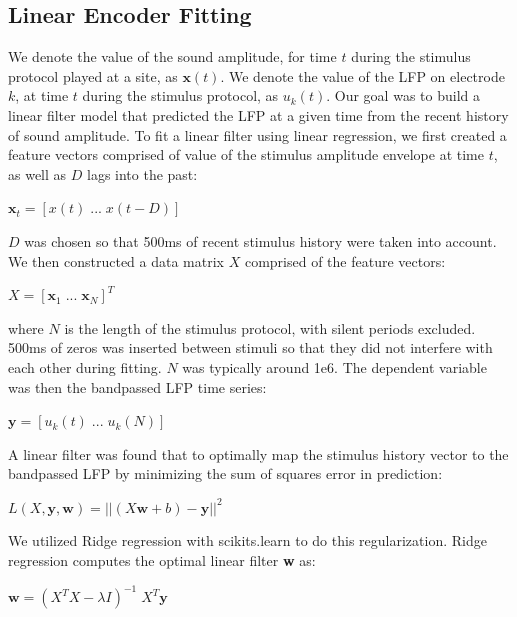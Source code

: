 \subsection{Linear Encoder Fitting}

We denote the value of the sound amplitude, for time $t$ during the stimulus protocol played at a site, as $\textbf{x}(t)$. We denote the value of the LFP on electrode $k$, at time $t$ during the stimulus protocol, as $u_k (t)$. Our goal was to build a linear filter model that predicted the LFP at a given time from the recent history of sound amplitude. To fit a linear filter using linear regression, we first created a feature vectors comprised of value of the stimulus amplitude envelope at time $t$, as well as $D$ lags into the past:

\begin{center}
$\textbf{x}_t = [x(t) \; ... \; x(t-D)]$
\end{center}

$D$ was chosen so that 500ms of recent stimulus history were taken into account. We then constructed a data matrix $X$ comprised of the feature vectors:

\begin{center}
$X = [\textbf{x}_1 \; ... \; \textbf{x}_{N}]^T$
\end{center}

where $N$ is the length of the stimulus protocol, with silent periods excluded. 500ms of zeros was inserted between stimuli so that they did not interfere with each other during fitting. $N$ was typically around 1e6. The dependent variable was then the bandpassed LFP time series:

\begin{center}
$\textbf{y} = [u_k (t) \; ... \; u_k (N)]$
\end{center}

A linear filter was found that to optimally map the stimulus history vector to the bandpassed LFP by minimizing the sum of squares error in prediction:

\begin{center}
$L(X, \textbf{y}, \textbf{w}) = || (X\textbf{w} + b) - \textbf{y} ||^2$ 
\end{center}

We utilized Ridge regression with scikits.learn to do this regularization. Ridge regression computes the optimal linear filter \textbf{w} as:

\begin{center}
$ \textbf{w} = (X^T X - \lambda I)^{-1} \; X^T \textbf{y}$
\end{center}

